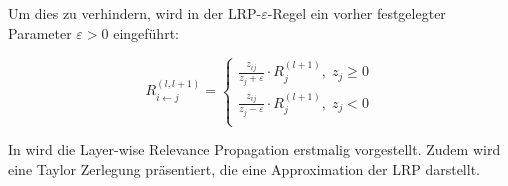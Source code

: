 \documentclass[11pt,a4paper]{article}
\numberwithin{equation}{section}
\begin{document}
	Um dies zu verhindern, wird in der LRP-$\varepsilon$-Regel ein vorher festgelegter Parameter $\varepsilon > 0$ eingeführt:
	
	\begin{equation}
	R_{i\leftarrow j}^{(l,l+1)} = \begin{cases}
	\frac{z_{ij}}{z_j +\varepsilon} \cdot R_j^{(l+1)}, \; z_j \geq 0\\
	\frac{z_{ij}}{z_j -\varepsilon}\cdot R_j^{(l+1)}, \; z_j < 0\\
	\end{cases}
	\end{equation}
	
	
	In \cite{LRP_first_paper} wird die Layer-wise Relevance Propagation erstmalig vorgestellt. Zudem wird eine Taylor Zerlegung präsentiert, die eine Approximation der LRP darstellt. 
	
\end{document}
